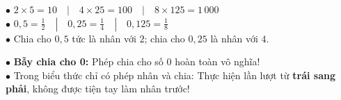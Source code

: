 \documentclass[14pt,a4paper,oneside]{extbook}
\begin{document}
\noindent
\begin{minipage}[t]{0.54\textwidth}
  \begin{tcolorbox}[
    enhanced,
    title={\footnotesize\bfseries\color{white}\faKey\ Các cặp số vàng nhân nhẩm siêu tốc},
    colback=green!3!white,
    colframe=green!60!black,
    arc=2.5mm, boxrule=0.8pt, top=1.8mm, bottom=1.8mm, left=2.2mm, right=2.2mm
  ]
    \footnotesize
    $\bullet$ $2 \times 5 = 10 \quad|\quad 4 \times 25 = 100 \quad|\quad 8 \times 125 = 1\,000$\\
    $\bullet$ $0,5 = \frac{1}{2} \quad|\quad 0,25 = \frac{1}{4} \quad|\quad 0,125 = \frac{1}{8}$\\
    $\bullet$ Chia cho $0,5$ tức là nhân với $2$; chia cho $0,25$ là nhân với $4$.
  \end{tcolorbox}
\end{minipage}%
\hfill
\begin{minipage}[t]{0.44\textwidth}
  \begin{tcolorbox}[
    enhanced,
    title={\footnotesize\bfseries\color{white}\faExclamationTriangle\ Mẹo tránh bẫy trắc nghiệm},
    colback=red!2!white,
    colframe=red!70!black,
    arc=2.5mm, boxrule=0.8pt, top=1.8mm, bottom=1.8mm, left=2.2mm, right=2.2mm
  ]
    \footnotesize
    $\bullet$ \textbf{Bẫy chia cho 0:} Phép chia cho số $0$ hoàn toàn vô nghĩa!\\
    $\bullet$ Trong biểu thức chỉ có phép nhân và chia: Thực hiện lần lượt từ \textbf{trái sang phải}, không được tiện tay làm nhân trước!
  \end{tcolorbox}
\end{minipage}
\end{document}
